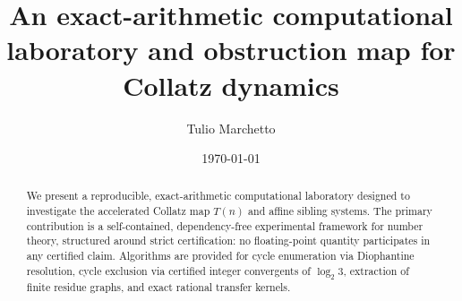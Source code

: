 \documentclass[11pt]{amsart}
\theoremstyle{definition}
\theoremstyle{remark}
\begin{document}
\title[An exact-arithmetic laboratory for Collatz dynamics]{An exact-arithmetic computational laboratory and obstruction map for Collatz dynamics}

\author{Tulio Marchetto}


\date{\today}

\begin{abstract}
We present a reproducible, exact-arithmetic computational laboratory designed to investigate the accelerated Collatz map $T(n)$ and affine sibling systems. The primary contribution is a self-contained, dependency-free experimental framework for number theory, structured around strict certification: no floating-point quantity participates in any certified claim. Algorithms are provided for cycle enumeration via Diophantine resolution, cycle exclusion via certified integer convergents of $\log_2 3$, extraction of finite residue graphs, and exact rational transfer kernels. 


\end{abstract}
\end{document}
